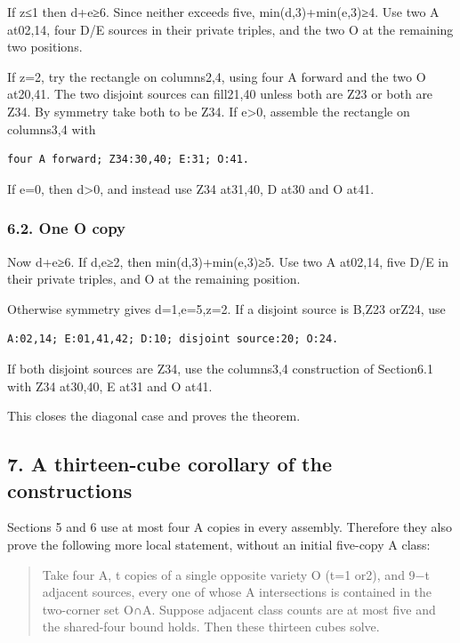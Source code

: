 \documentclass[
  10pt,
]{article}
\begin{document}
If z≤1 then d+e≥6. Since neither exceeds five, min(d,3)+min(e,3)≥4. Use
two A at02,14, four D/E sources in their private triples, and the two O
at the remaining two positions.

If z=2, try the rectangle on columns2,4, using four A forward and the
two O at20,41. The two disjoint sources can fill21,40 unless both are
Z23 or both are Z34. By symmetry take both to be Z34. If e\textgreater0,
assemble the rectangle on columns3,4 with

\begin{verbatim}
four A forward; Z34:30,40; E:31; O:41.
\end{verbatim}

If e=0, then d\textgreater0, and instead use Z34 at31,40, D at30 and O
at41.

\hypertarget{one-o-copy-1}{%
\subsubsection*{6.2. One O copy}\label{one-o-copy-1}}

Now d+e≥6. If d,e≥2, then min(d,3)+min(e,3)≥5. Use two A at02,14, five
D/E in their private triples, and O at the remaining position.

Otherwise symmetry gives d=1,e=5,z=2. If a disjoint source is B,Z23
orZ24, use

\begin{verbatim}
A:02,14; E:01,41,42; D:10; disjoint source:20; O:24.
\end{verbatim}

If both disjoint sources are Z34, use the columns3,4 construction of
Section6.1 with Z34 at30,40, E at31 and O at41.

This closes the diagonal case and proves the theorem.

\hypertarget{a-thirteen-cube-corollary-of-the-constructions}{%
\subsection*{7. A thirteen-cube corollary of the
constructions}\label{a-thirteen-cube-corollary-of-the-constructions}}

Sections 5 and 6 use at most four A copies in every assembly. Therefore
they also prove the following more local statement, without an initial
five-copy A class:

\begin{quote}
Take four A, t copies of a single opposite variety O (t=1 or2), and 9−t
adjacent sources, every one of whose A intersections is contained in the
two-corner set O∩A. Suppose adjacent class counts are at most five and
the shared-four bound holds. Then these thirteen cubes solve.
\end{quote}
\end{document}
